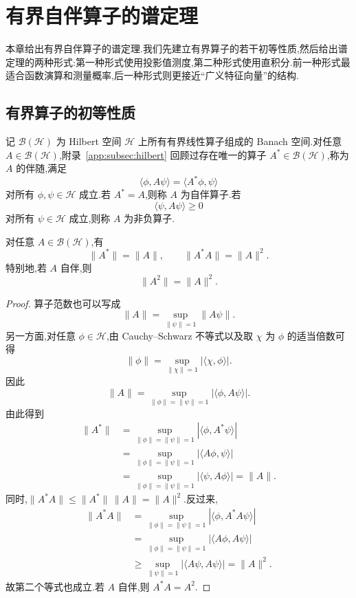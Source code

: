 \chapter{有界自伴算子的谱定理}
\label{chap:bounded-spectral-theorem}

本章给出有界自伴算子的谱定理.我们先建立有界算子的若干初等性质,然后给出谱定理的两种形式:第一种形式使用投影值测度,第二种形式使用直积分.前一种形式最适合函数演算和测量概率,后一种形式则更接近“广义特征向量”的结构.

\section{有界算子的初等性质}
\label{sec:bounded-operator-properties}

记 \(\mathcal{B}(\mathcal{H})\) 为 Hilbert 空间 \(\mathcal{H}\) 上所有有界线性算子组成的 Banach 空间.对任意 \(A\in\mathcal{B}(\mathcal{H})\),附录~\ref{app:subsec:hilbert} 回顾过存在唯一的算子 \(A^{*}\in\mathcal{B}(\mathcal{H})\),称为 \(A\) 的伴随,满足
\[
\langle\phi,A\psi\rangle=\langle A^{*}\phi,\psi\rangle
\]
对所有 \(\phi,\psi\in\mathcal{H}\) 成立.若 \(A^{*}=A\),则称 \(A\) 为自伴算子.若
\[
\langle\psi,A\psi\rangle\geq 0
\label{eq:bounded-nonnegative}
\]
对所有 \(\psi\in\mathcal{H}\) 成立,则称 \(A\) 为非负算子.

\begin{proposition}[伴随算子的范数]\label{prop:adjoint-norm}
对任意 \(A\in\mathcal{B}(\mathcal{H})\),有
\[
\|A^{*}\|=\|A\|,
\qquad
\|A^{*}A\|=\|A\|^{2}.
\]
特别地,若 \(A\) 自伴,则
\[
\|A^{2}\|=\|A\|^{2}.
\]
\end{proposition}

\begin{proof}
算子范数也可以写成
\[
\|A\|=\sup_{\|\psi\|=1}\|A\psi\|.
\]
另一方面,对任意 \(\phi\in\mathcal{H}\),由 Cauchy--Schwarz 不等式以及取 \(\chi\) 为 \(\phi\) 的适当倍数可得
\[
\|\phi\|=\sup_{\|\chi\|=1}|\langle\chi,\phi\rangle|.
\]
因此
\[
\|A\|=\sup_{\|\phi\|=\|\psi\|=1}|\langle\phi,A\psi\rangle|.
\]
由此得到
\begin{align*}
\|A^{*}\|
&=\sup_{\|\phi\|=\|\psi\|=1}|\langle\phi,A^{*}\psi\rangle|\\
&=\sup_{\|\phi\|=\|\psi\|=1}|\langle A\phi,\psi\rangle|\\
&=\sup_{\|\phi\|=\|\psi\|=1}|\langle\psi,A\phi\rangle|=\|A\|.
\end{align*}
同时,\(\|A^{*}A\|\leq\|A^{*}\|\,\|A\|=\|A\|^{2}\).反过来,
\begin{align*}
\|A^{*}A\|
&=\sup_{\|\phi\|=\|\psi\|=1}|\langle\phi,A^{*}A\psi\rangle|\\
&=\sup_{\|\phi\|=\|\psi\|=1}|\langle A\phi,A\psi\rangle|\\
&\geq\sup_{\|\psi\|=1}|\langle A\psi,A\psi\rangle|=\|A\|^{2}.
\end{align*}
故第二个等式也成立.若 \(A\) 自伴,则 \(A^{*}A=A^{2}\).
\end{proof}

